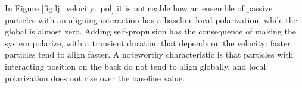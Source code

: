 \documentclass[../../master_thesis_np.tex]{subfiles}
\begin{document}
		In Figure \ref{fig:lj_velocity_pol} it is noticeable how an ensemble of passive particles with an aligning interaction has a baseline local polarization, while the global is almost zero. 
		Adding self-propulsion has the consequence of making the system polarize, with a transient duration that depends on the velocity: faster particles tend to align faster. 
		A noteworthy characteristic is that particles with interacting position on the back do not tend to align globally, and local polarization does not rise over the baseline value.
		
		\begin{figure}[hbtp]
			\centering\
			\\
			\\
			

\end{figure}
\end{document}

